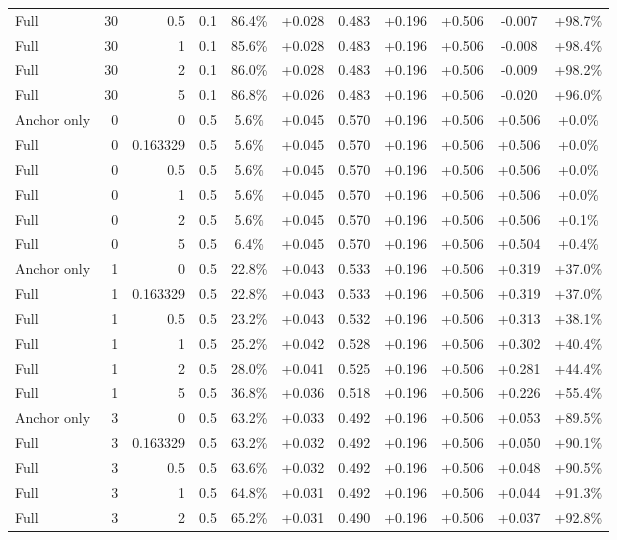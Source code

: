 \begin{table}[htbp]
\begin{tabular}{lrrrccccccc}
Full & 30 & 0.5 & 0.1 & 86.4\% & +0.028 & 0.483 & +0.196 & +0.506 & -0.007 & +98.7\% \\
Full & 30 & 1 & 0.1 & 85.6\% & +0.028 & 0.483 & +0.196 & +0.506 & -0.008 & +98.4\% \\
Full & 30 & 2 & 0.1 & 86.0\% & +0.028 & 0.483 & +0.196 & +0.506 & -0.009 & +98.2\% \\
Full & 30 & 5 & 0.1 & 86.8\% & +0.026 & 0.483 & +0.196 & +0.506 & -0.020 & +96.0\% \\
Anchor only & 0 & 0 & 0.5 & 5.6\% & +0.045 & 0.570 & +0.196 & +0.506 & +0.506 & +0.0\% \\
Full & 0 & 0.163329 & 0.5 & 5.6\% & +0.045 & 0.570 & +0.196 & +0.506 & +0.506 & +0.0\% \\
Full & 0 & 0.5 & 0.5 & 5.6\% & +0.045 & 0.570 & +0.196 & +0.506 & +0.506 & +0.0\% \\
Full & 0 & 1 & 0.5 & 5.6\% & +0.045 & 0.570 & +0.196 & +0.506 & +0.506 & +0.0\% \\
Full & 0 & 2 & 0.5 & 5.6\% & +0.045 & 0.570 & +0.196 & +0.506 & +0.506 & +0.1\% \\
Full & 0 & 5 & 0.5 & 6.4\% & +0.045 & 0.570 & +0.196 & +0.506 & +0.504 & +0.4\% \\
Anchor only & 1 & 0 & 0.5 & 22.8\% & +0.043 & 0.533 & +0.196 & +0.506 & +0.319 & +37.0\% \\
Full & 1 & 0.163329 & 0.5 & 22.8\% & +0.043 & 0.533 & +0.196 & +0.506 & +0.319 & +37.0\% \\
Full & 1 & 0.5 & 0.5 & 23.2\% & +0.043 & 0.532 & +0.196 & +0.506 & +0.313 & +38.1\% \\
Full & 1 & 1 & 0.5 & 25.2\% & +0.042 & 0.528 & +0.196 & +0.506 & +0.302 & +40.4\% \\
Full & 1 & 2 & 0.5 & 28.0\% & +0.041 & 0.525 & +0.196 & +0.506 & +0.281 & +44.4\% \\
Full & 1 & 5 & 0.5 & 36.8\% & +0.036 & 0.518 & +0.196 & +0.506 & +0.226 & +55.4\% \\
Anchor only & 3 & 0 & 0.5 & 63.2\% & +0.033 & 0.492 & +0.196 & +0.506 & +0.053 & +89.5\% \\
Full & 3 & 0.163329 & 0.5 & 63.2\% & +0.032 & 0.492 & +0.196 & +0.506 & +0.050 & +90.1\% \\
Full & 3 & 0.5 & 0.5 & 63.6\% & +0.032 & 0.492 & +0.196 & +0.506 & +0.048 & +90.5\% \\
Full & 3 & 1 & 0.5 & 64.8\% & +0.031 & 0.492 & +0.196 & +0.506 & +0.044 & +91.3\% \\
Full & 3 & 2 & 0.5 & 65.2\% & +0.031 & 0.490 & +0.196 & +0.506 & +0.037 & +92.8\% \\

\end{tabular}
\end{table}
